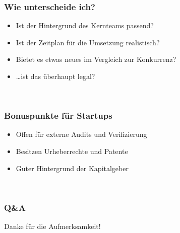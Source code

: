 \documentclass[handout]{beamer}
\begin{document}
\begin{frame}
    \frametitle{Wie unterscheide ich?}
    \begin{itemize}
        \item<1-> Ist der Hintergrund des Kernteams passend?
        \item<2-> Ist der Zeitplan für die Umsetzung realistisch?
        \item<3-> Bietet es etwas neues im Vergleich zur Konkurrenz?
        \item<4-> \dots ist das überhaupt legal?
    \end{itemize} ~\\
\end{frame}

\begin{frame}
    \frametitle{Bonuspunkte für Startups}
    \begin{itemize}
        \item<1-> Offen für externe Audits und Verifizierung
        \item<2-> Besitzen Urheberrechte und Patente
        \item<3-> Guter Hintergrund der Kapitalgeber
    \end{itemize} ~\\
\end{frame}

\begin{frame}
    \frametitle{Q\&A}
    \pause
    Danke für die Aufmerksamkeit!
\end{frame}


    
\end{document}
